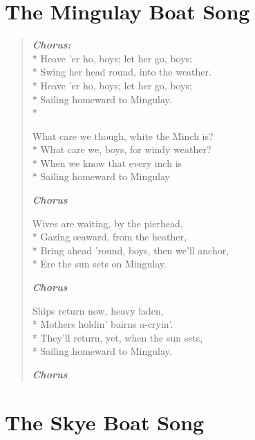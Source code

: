 \documentclass[9pt,twoside]{extarticle}
\newenvironment{xverse}{
	\begin{verse}
	\fontsize{8.5}{10.5}\selectfont
	}
	{
	\end{verse}
	\penalty 0
}
\newcommand{\chorusdef}{\textbf{\emph{Chorus:}}\\*}
\newcommand{\chorusmark}[1][1]{%
\vspace{-0.5\stanzaskip}%
\textbf{\emph{Chorus \ifthenelse{\equal{#1}{1}}{}{$\times$ #1}}}%
\vspace{-0.5\stanzaskip}%
}
\begin{document}
\section{The Mingulay Boat Song}

\begin{xverse}
\chorusdef
Heave ’er ho, boys; let her go, boys; \\*
Swing her head round, into the weather. \\*
Heave ’er ho, boys; let her go, boys; \\*
Sailing homeward to Mingulay. \\*

What care we though, white the Minch is? \\*
What care we, boys, for windy weather? \\*
When we know that every inch is \\*
Sailing homeward to Mingulay

\chorusmark

Wives are waiting, by the pierhead, \\*
Gazing seaward, from the heather, \\*
Bring ahead ’round, boys, then we’ll anchor, \\*
Ere the sun sets on Mingulay.

\chorusmark

Ships return now, heavy laden, \\*
Mothers holdin’ bairns a-cryin’. \\*
They’ll return, yet, when the sun sets, \\*
Sailing homeward to Mingulay.

\chorusmark[2]
\end{xverse}

\section{The Skye Boat Song}
\end{document}
